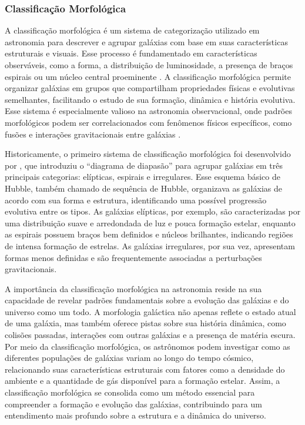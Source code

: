 \subsubsection{Classificação Morfológica}
\label{sec:classificao}

A classificação morfológica é um sistema de categorização utilizado em astronomia para descrever e agrupar galáxias com base em suas características estruturais e visuais. Esse processo é fundamentado em características observáveis, como a forma, a distribuição de luminosidade, a presença de braços espirais ou um núcleo central proeminente \citep{steinmetz2002galaxy}. A classificação morfológica permite organizar galáxias em grupos que compartilham propriedades físicas e evolutivas semelhantes, facilitando o estudo de sua formação, dinâmica e história evolutiva. Esse sistema é especialmente valioso na astronomia observacional, onde padrões morfológicos podem ser correlacionados com fenômenos físicos específicos, como fusões e interações gravitacionais entre galáxias \citep{van1998galaxy}.

Historicamente, o primeiro sistema de classificação morfológica foi desenvolvido por \citet{hubble1926}, que introduziu o ``diagrama de diapasão'' para agrupar galáxias em três principais categorias: elípticas, espirais e irregulares. Esse esquema básico de Hubble, também chamado de sequência de Hubble, organizava as galáxias de acordo com sua forma e estrutura, identificando uma possível progressão evolutiva entre os tipos. As galáxias elípticas, por exemplo, são caracterizadas por uma distribuição suave e arredondada de luz e pouca formação estelar, enquanto as espirais possuem braços bem definidos e núcleos brilhantes, indicando regiões de intensa formação de estrelas. As galáxias irregulares, por sua vez, apresentam formas menos definidas e são frequentemente associadas a perturbações gravitacionais.

A importância da classificação morfológica na astronomia reside na sua capacidade de revelar padrões fundamentais sobre a evolução das galáxias e do universo como um todo. A morfologia galáctica não apenas reflete o estado atual de uma galáxia, mas também oferece pistas sobre sua história dinâmica, como colisões passadas, interações com outras galáxias e a presença de matéria escura. Por meio da classificação morfológica, os astrônomos podem investigar como as diferentes populações de galáxias variam ao longo do tempo cósmico, relacionando suas características estruturais com fatores como a densidade do ambiente e a quantidade de gás disponível para a formação estelar. Assim, a classificação morfológica se consolida como um método essencial para compreender a formação e evolução das galáxias, contribuindo para um entendimento mais profundo sobre a estrutura e a dinâmica do universo.



